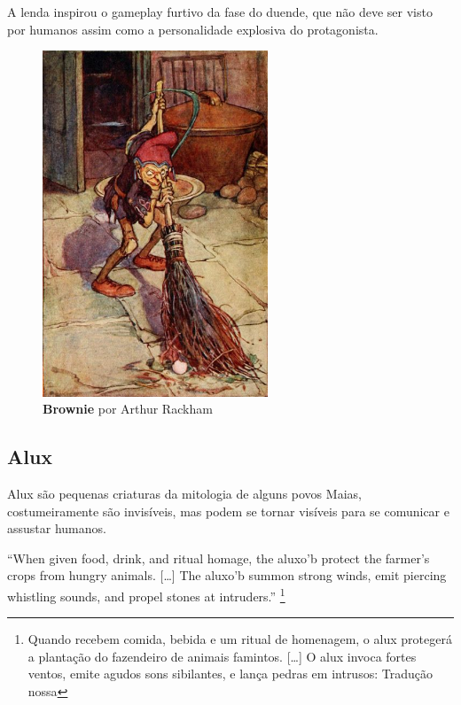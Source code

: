 A lenda inspirou o gameplay furtivo da fase do duende, que não deve ser visto por humanos assim como a personalidade explosiva do protagonista.

\begin{figure}[!htb]
    \caption{\label{fig_brownie}\textbf{Brownie} por Arthur Rackham }
    \begin{center} \includegraphics[width=0.6\textwidth]{imagens/brownie.jpg}
    \end{center}  \end{figure}

\clearpage


\subsection{Alux}

Alux são pequenas criaturas da mitologia de alguns povos Maias, costumeiramente
são invisíveis, mas podem se tornar visíveis para se comunicar e assustar
humanos. 

\begin{citacao}
``When given food, drink, and ritual homage, the aluxo'b protect the farmer’s crops from hungry animals. [\ldots] The aluxo'b summon strong winds, emit piercing whistling sounds, and propel stones at intruders.'' 
\cite{storniolo2009out} \footnote{Quando recebem comida, bebida e
um ritual de homenagem, o alux protegerá a plantação do fazendeiro de
animais famintos. [\ldots] O alux invoca fortes ventos, emite agudos sons
sibilantes, e lança pedras em intrusos: Tradução nossa}
\end{citacao}



